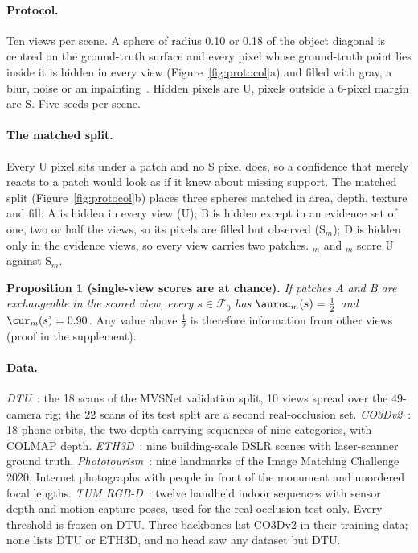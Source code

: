 \documentclass[10pt,twocolumn,letterpaper]{article}
\begin{document}
\paragraph{Protocol.}
Ten views per scene. A sphere of radius 0.10 or 0.18 of the object diagonal is centred on the ground-truth surface and every pixel whose ground-truth point lies inside it is hidden in every view (Figure~\ref{fig:protocol}a) and filled with gray, a blur, noise or an inpainting~\cite{telea}. Hidden pixels are U, pixels outside a 6-pixel margin are S. Five seeds per scene.

\paragraph{The matched split.}
Every U pixel sits under a patch and no S pixel does, so a confidence that merely reacts to a patch would look as if it knew about missing support. The matched split (Figure~\ref{fig:protocol}b) places three spheres matched in area, depth, texture and fill: A is hidden in every view (U); B is hidden except in an evidence set of one, two or half the views, so its pixels are filled but observed (S$_m$); D is hidden only in the evidence views, so every view carries two patches. \auroc$_m$ and \cur$_m$ score U against S$_m$.

\noindent\textbf{Proposition 1 (single-view scores are at chance).}
\emph{If patches A and B are exchangeable in the scored view, every $s\in\mathcal{F}_0$ has $\auroc_m(s)=\tfrac12$ and $\cur_m(s)=0.90$.}
Any value above $\tfrac12$ is therefore information from other views (proof in the supplement).

\paragraph{Data.}
\emph{DTU}~\cite{dtu}: the 18 scans of the MVSNet validation split, 10 views spread over the 49-camera rig; the 22 scans of its test split are a second real-occlusion set. \emph{CO3Dv2}~\cite{co3d}: 18 phone orbits, the two depth-carrying sequences of nine categories, with COLMAP depth. \emph{ETH3D}~\cite{eth3d}: nine building-scale DSLR scenes with laser-scanner ground truth. \emph{Phototourism}~\cite{imc2020}: nine landmarks of the Image Matching Challenge 2020, Internet photographs with people in front of the monument and unordered focal lengths. \emph{TUM RGB-D}~\cite{tum}: twelve handheld indoor sequences with sensor depth and motion-capture poses, used for the real-occlusion test only. Every threshold is frozen on DTU. Three backbones list CO3Dv2 in their training data; none lists DTU or ETH3D, and no head saw any dataset but DTU.
\end{document}
